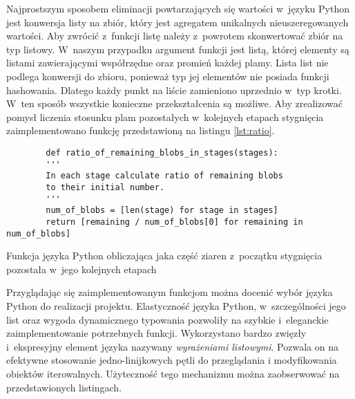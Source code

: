 Najprostszym sposobem eliminacji powtarzających się wartości w~języku Python
jest konwersja listy na zbiór, który jest agregatem unikalnych
nieuszeregowanych wartości.
Aby zwrócić z~funkcji listę należy z~powrotem skonwertować zbiór na typ
listowy.
W~naszym przypadku argument funkcji jest listą, której elementy są listami
zawierającymi współrzędne oraz promień każdej plamy.
Lista list nie podlega konwersji do zbioru, ponieważ typ jej elementów
nie posiada funkcji hashowania.
Dlatego każdy punkt na liście zamieniono uprzednio w~typ krotki.
W~ten sposób wszystkie konieczne przekształcenia są możliwe.
Aby zrealizować pomysł liczenia stosunku plam pozostałych w~kolejnych etapach
stygnięcia zaimplementowano funkcję przedstawioną na listingu
\ref{lst:ratio}.
\begin{listing}[htb]
	\begin{verbatim}
		def ratio_of_remaining_blobs_in_stages(stages):
		'''
		In each stage calculate ratio of remaining blobs
		to their initial number.
		'''
		num_of_blobs = [len(stage) for stage in stages]
		return [remaining / num_of_blobs[0] for remaining in num_of_blobs]
	\end{verbatim}
	\caption{Funkcja języka Python obliczająca jaka część ziaren z~początku
		stygnięcia pozostała w~jego kolejnych etapach}
	\label{lst:ratio}
\end{listing}

Przyglądając się zaimplementowanym funkcjom można docenić wybór języka
Python do realizacji projektu.
Elastyczność języka Python, w~szczególności jego list oraz wygoda
dynamicznego typowania pozwoliły na szybkie i~eleganckie zaimplementowanie
potrzebnych funkcji.
Wykorzystano bardzo zwięzły i~ekspresyjny element języka nazywany
\emph{wyrażeniami listowymi}.
Pozwala on na efektywne stosowanie jedno-linijkowych pętli do przeglądania
i modyfikowania obiektów iterowalnych.
Użyteczność tego mechanizmu można zaobserwować na przedstawionych listingach.

